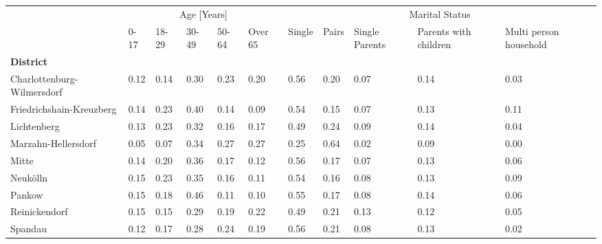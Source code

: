 \begin{sidewaystable}
  \centering
\noindent
\begin{tabularx}{\textwidth}{|p{3cm}|*{5}X|*{5}X|}
  \hline
  {} & \multicolumn{5}{c|}{Age [Years]} & \multicolumn{5}{c|}{Marital Status} \\
  {} & 0-17 & 18-29 & 30-49 & 50-64 & Over 65 & Single & Pairs & Single Parents & Parents with children & Multi person household \\
  \textbf{District} & {}& {}& {}& {}& {}& {}& {}& {}& {}& {}\\\hline
  Charlottenburg-Wilmersdorf &           0.12 &        0.14 &        0.30 &        0.23 &          0.20 &             0.56 &  0.20 &           0.07 &                  0.14 &                  0.03 \\\hline
  Friedrichshain-Kreuzberg   &           0.14 &        0.23 &        0.40 &        0.14 &          0.09 &             0.54 &  0.15 &           0.07 &                  0.13 &                  0.11 \\\hline
  Lichtenberg                &           0.13 &        0.23 &        0.32 &        0.16 &          0.17 &             0.49 &  0.24 &           0.09 &                  0.14 &                  0.04 \\\hline
  Marzahn-Hellersdorf        &           0.05 &        0.07 &        0.34 &        0.27 &          0.27 &             0.25 &  0.64 &           0.02 &                  0.09 &                  0.00 \\\hline
  Mitte                      &           0.14 &        0.20 &        0.36 &        0.17 &          0.12 &             0.56 &  0.17 &           0.07 &                  0.13 &                  0.06 \\\hline
  Neukölln                   &           0.15 &        0.23 &        0.35 &        0.16 &          0.11 &             0.54 &  0.16 &           0.08 &                  0.13 &                  0.09 \\\hline
  Pankow                     &           0.15 &        0.18 &        0.46 &        0.11 &          0.10 &             0.55 &  0.17 &           0.08 &                  0.14 &                  0.06 \\\hline
  Reinickendorf              &           0.15 &        0.15 &        0.29 &        0.19 &          0.22 &             0.49 &  0.21 &           0.13 &                  0.12 &                  0.05 \\\hline
  Spandau                    &           0.12 &        0.17 &        0.28 &        0.24 &          0.19 &             0.56 &  0.21 &           0.08 &                  0.13 &                  0.02 \\\hline

\end{tabularx}
\end{sidewaystable}
